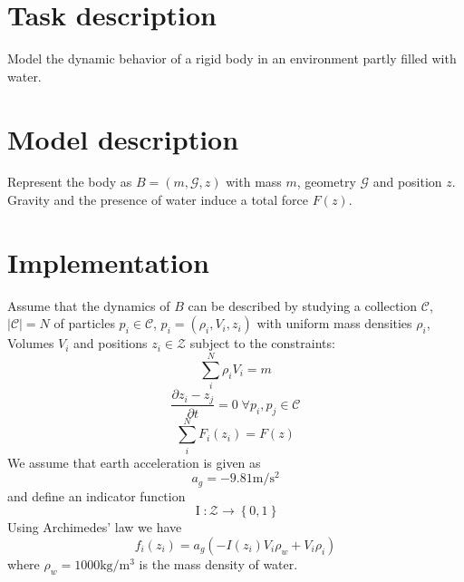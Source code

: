 
\section{Task description}
Model the dynamic behavior of a rigid body in an environment partly filled with water.

\section{Model description}
Represent the body as $B = \left(m, \mathcal{G}, z\right)$ with mass $m$, geometry $\mathcal{G}$ and position $z$. 
Gravity and the presence of water induce a total force $F(z)$.  

\section{Implementation}
Assume that the dynamics of $B$  can be described by studying a collection $\mathcal{C}$, $|\mathcal{C}| = N$ of particles $p_i \in \mathcal{C}$, $p_i = \left(\rho_i, V_i, z_i\right)$ with uniform mass densities $\rho_i$, Volumes $V_i$ and positions $z_i \in \mathcal{Z}$ subject to the constraints:
$$\sum\limits_i^N \rho_i V_i = m$$
$$\frac{\partial z_i - z_j}{\partial t} = 0 \; \forall p_i, p_j \in \mathcal{C}$$
$$\sum\limits_i^N F_i(z_i) = F(z)$$
We assume that earth acceleration is given as
$$a_g = - \num{9.81}  \si{\metre\per\square\second}$$ 
and define an indicator function
$$\operatorname{I}: \mathcal{Z} \to \left\{ 0, 1\right\}$$
Using Archimedes' law we have 
$$f_i(z_i) = a_g(- I(z_i) V_i \rho_w + V_i \rho_i)$$
where $\rho_w = \num{1000} \si{\kilo\gram\per\cubic\metre}$ is the mass density of water.

